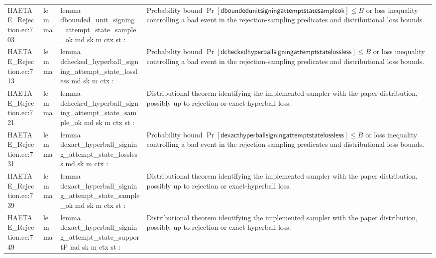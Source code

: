 \documentclass[10pt]{article}
\begin{document}
\begin{longtable}{L{0.11\textwidth}L{0.055\textwidth}L{0.385\textwidth}L{0.41\textwidth}}
HAETAE\_\allowbreak{}Rejection.\allowbreak{}ec:\allowbreak{}703 & lemma & {\ttfamily\scriptsize lemma dbounded\_\allowbreak{}unit\_\allowbreak{}signing\_\allowbreak{}attempt\_\allowbreak{}state\_\allowbreak{}sample\_\allowbreak{}ok md sk m ctx st :} & Probability bound $\Pr[\mathsf{dboundedunitsigningattemptstatesampleok}]\le B$ or loss inequality controlling a bad event in the rejection-sampling predicates and distributional loss bounds. \\
HAETAE\_\allowbreak{}Rejection.\allowbreak{}ec:\allowbreak{}713 & lemma & {\ttfamily\scriptsize lemma dchecked\_\allowbreak{}hyperball\_\allowbreak{}signing\_\allowbreak{}attempt\_\allowbreak{}state\_\allowbreak{}lossless md sk m ctx :} & Probability bound $\Pr[\mathsf{dcheckedhyperballsigningattemptstatelossless}]\le B$ or loss inequality controlling a bad event in the rejection-sampling predicates and distributional loss bounds. \\
HAETAE\_\allowbreak{}Rejection.\allowbreak{}ec:\allowbreak{}721 & lemma & {\ttfamily\scriptsize lemma dchecked\_\allowbreak{}hyperball\_\allowbreak{}signing\_\allowbreak{}attempt\_\allowbreak{}state\_\allowbreak{}sample\_\allowbreak{}ok md sk m ctx st :} & Distributional theorem identifying the implemented sampler with the paper distribution, possibly up to rejection or exact-hyperball loss. \\
HAETAE\_\allowbreak{}Rejection.\allowbreak{}ec:\allowbreak{}731 & lemma & {\ttfamily\scriptsize lemma dexact\_\allowbreak{}hyperball\_\allowbreak{}signing\_\allowbreak{}attempt\_\allowbreak{}state\_\allowbreak{}lossless md sk m ctx :} & Probability bound $\Pr[\mathsf{dexacthyperballsigningattemptstatelossless}]\le B$ or loss inequality controlling a bad event in the rejection-sampling predicates and distributional loss bounds. \\
HAETAE\_\allowbreak{}Rejection.\allowbreak{}ec:\allowbreak{}739 & lemma & {\ttfamily\scriptsize lemma dexact\_\allowbreak{}hyperball\_\allowbreak{}signing\_\allowbreak{}attempt\_\allowbreak{}state\_\allowbreak{}sample\_\allowbreak{}ok md sk m ctx st :} & Distributional theorem identifying the implemented sampler with the paper distribution, possibly up to rejection or exact-hyperball loss. \\
HAETAE\_\allowbreak{}Rejection.\allowbreak{}ec:\allowbreak{}749 & lemma & {\ttfamily\scriptsize lemma dexact\_\allowbreak{}hyperball\_\allowbreak{}signing\_\allowbreak{}attempt\_\allowbreak{}state\_\allowbreak{}supportP md sk m ctx st :} & Distributional theorem identifying the implemented sampler with the paper distribution, possibly up to rejection or exact-hyperball loss. \\

\end{longtable}
\end{document}
